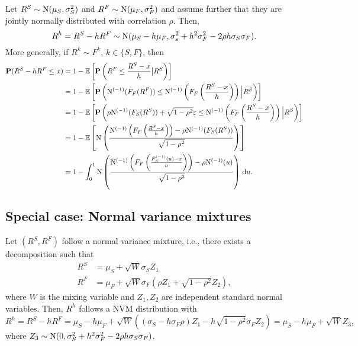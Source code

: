 \documentclass[square]{article} %
\theoremstyle{plain}
\theoremstyle{definition} %
\begin{document}
Let $R^S\sim {\rm N}(\mu_S, \sigma_S^2)$ and $R^F\sim {\rm N}(\mu_F,
\sigma_F^2)$ and assume further that they are jointly normally
distributed with correlation $\rho$. Then,
\begin{equation*}
  R^h = R^S - h R^F \sim {\rm N}(\mu_S - h \mu_F, \sigma_s^2 + h^2
  \sigma_F^2 - 2\rho h \sigma_S \sigma_F).
\end{equation*}
More generally, if $R^k\sim F^k$, $k\in \{S,F\}$, then
\begin{align*}
  \p(R^S-h R^F\leq x)
  &= 1-\E\left[ \p\left(R^F\leq \frac{R^S-x}{h}\big| R^S\right)\right] \\ %
  &= 1-\E\left[\p \left(\Ncdf^{(-1)}(F_F(R^F)) \leq
    \Ncdf^{(-1)}\left(F_F\left(\frac{R^S-x}{h}\right)\right) \Big|
    R^S\right)\right] \\%
  &= 1-\E\left[ \p\left(\rho \Ncdf^{(-1)}(F_S(R^S)) + \sqrt{1-\rho^2}
    \varepsilon \leq \Ncdf^{(-1)}\left(F_F\left(\frac{R^S-x}{h}\right)\right) \Big|
    R^S\right)\right]\\ %
  &= 1-\E\left[ \Ncdf \left(
    \frac{\Ncdf^{(-1)}\left(F_F\left(\frac{R^S-x}{h}\right)\right) -\rho
    \Ncdf^{(-1)}(F_S(R^S))} { \sqrt{1-\rho^2}}\right)\right]\\
  &= 1-\int_0^1  \Ncdf \left(
    \frac{\Ncdf^{(-1)}\left(F_F\left(\frac{F_S^{(-1)}(u)-x}{h}\right)\right) -\rho
    \Ncdf^{(-1)}(u)} { \sqrt{1-\rho^2}}\right) \,\dd u.
\end{align*}


\subsection{Special case: Normal variance mixtures}
\label{sec:special-case:-normal}

Let $(R^S, R^F)$ follow a normal variance mixture, i.e., there exists a
decomposition such that
\begin{align*}
  R^S &=\mu_S + \sqrt{W} \sigma_S Z_1\\
  R^F &= \mu_F + \sqrt{W} \sigma_F (\rho Z_1 + \sqrt{1-\rho^2} Z_2),
\end{align*}
where $W$ is the mixing variable and $Z_1, Z_2$ are independent
standard normal variables. Then, $R^h$ follows a NVM distribution with
\begin{equation*}
  R^h = R^S - h R^F =  \mu_S - h \mu_F + \sqrt{W}
  \left((\sigma_S-h\sigma_F\rho)Z_1 -h \sqrt{1-\rho^2} 
    \sigma_F Z_2\right) = \mu_S - h \mu_F + \sqrt{W} Z_3,
\end{equation*}
where $Z_3\sim {\rm N}(0, \sigma_S^2 + h^2\sigma_F^2 - 2\rho
h\sigma_S \sigma_F)$. 
\end{document}
